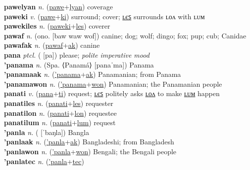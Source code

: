 \textbf{pawelyan} \textit{n.} (\hyperref[pawe]{pawe}+\hyperref[lyan]{lyan})
coverage \label{pawelyan} \\
\textbf{paweki} \textit{v.} (\hyperref[pawe]{pawe}+\hyperref[ki]{ki})
surround; cover; \hyperref[pawekiles]{ʟєꜱ} surrounds ʟᴏᴧ with ʟᴜᴍ \label{paweki} \\
\textbf{pawekiles} \textit{n.} (\hyperref[paweki]{paweki}+\hyperref[les]{les})
coverer \label{pawekiles} \\
\textbf{pawaf} \textit{n.} (ono. [baw waw wof])
canine; dog; wolf; dingo; fox; pup; cub; Canidae \label{pawaf} \\
\textbf{pawafak} \textit{n.} (\hyperref[pawaf]{pawaf}+\hyperref[ak]{ak})
canine \label{pawafak} \\
\textbf{pana} \textit{ptcl.} ( [pa])
please; \textit{polite imperative mood} \label{pana} \\
\textbf{'panama} \textit{n.} (Spa. ⟨Panamá⟩ [panaˈma])
Panama \label{'panama} \\
\textbf{'panamaak} \textit{n.} (\hyperref['panama]{'panama}+\hyperref[ak]{ak})
Panamanian; from Panama \label{'panamaak} \\
\textbf{'panamawon} \textit{n.} (\hyperref['panama]{'panama}+\hyperref[won]{won})
Panamanian; the Panamanian people \label{'panamawon} \\
\textbf{panati} \textit{v.} (\hyperref[pana]{pana}+\hyperref[ti]{ti})
request; \hyperref[panatiles]{ʟєꜱ} politely asks \hyperref[panatilon]{ʟᴏᴧ} to make \hyperref[panatilum]{ʟᴜᴍ} happen \label{panati} \\
\textbf{panatiles} \textit{n.} (\hyperref[panati]{panati}+\hyperref[les]{les})
requester \label{panatiles} \\
\textbf{panatilon} \textit{n.} (\hyperref[panati]{panati}+\hyperref[lon]{lon})
requestee \label{panatilon} \\
\textbf{panatilum} \textit{n.} (\hyperref[panati]{panati}+\hyperref[lum]{lum})
request \label{panatilum} \\
\textbf{'panla} \textit{n.} ( [ˈbaŋla])
Bangla \label{'panla} \\
\textbf{'panlaak} \textit{n.} (\hyperref['panla]{'panla}+\hyperref[ak]{ak})
Bangladeshi; from Bangladesh \label{'panlaak} \\
\textbf{'panlawon} \textit{n.} (\hyperref['panla]{'panla}+\hyperref[won]{won})
Bengali; the Bengali people \label{'panlawon} \\
\textbf{'panlatec} \textit{n.} (\hyperref['panla]{'panla}+\hyperref[tec]{tec})

